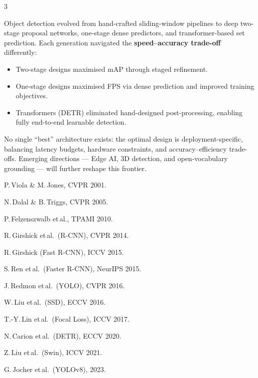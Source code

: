 \documentclass[10pt]{article} %
\renewcommand{\small}       {\fontsize{18pt}{23pt}\selectfont}
\renewcommand{\LARGE}       {\fontsize{38pt}{46pt}\selectfont}
\newcommand{\sechead}[1]{%
  \par\vspace*{0.45cm}%
  \noindent%
  \colorbox{posterblue}{%
    \makebox[\dimexpr\linewidth-2\fboxsep\relax][l]{%
      \hspace{0.5cm}{\color{white}\bfseries\LARGE\strut #1}%
    }%
  }%
  \par\vspace{0.3cm}%
  \noindent%
}
\begin{document}
\begin{multicols}{3}
\sechead{CONCLUSION}

Object detection evolved from hand-crafted sliding-window pipelines to
deep two-stage proposal networks, one-stage dense predictors, and
transformer-based set prediction.  Each generation navigated the
\textbf{speed--accuracy trade-off} differently:
\begin{itemize}[nosep, leftmargin=*]
  \item Two-stage designs maximised mAP through staged refinement.
  \item One-stage designs maximised FPS via dense prediction and
    improved training objectives.
  \item Transformers (DETR) eliminated hand-designed post-processing,
    enabling fully end-to-end learnable detection.
\end{itemize}

\medskip
No single ``best'' architecture exists: the optimal design is
deployment-specific, balancing latency budgets, hardware constraints,
and accuracy--efficiency trade-offs.  Emerging directions --- Edge AI,
3D detection, and open-vocabulary grounding --- will further reshape
this frontier.

\sechead{REFERENCES}

\begin{enumerate}[nosep, leftmargin=*, label={[\arabic*]}]
\small
\item P.\,Viola \& M.\,Jones, CVPR 2001.
\item N.\,Dalal \& B.\,Triggs, CVPR 2005.
\item P.\,Felzenszwalb et\,al., TPAMI 2010.
\item R.\,Girshick et\,al.\ (R-CNN), CVPR 2014.
\item R.\,Girshick (Fast R-CNN), ICCV 2015.
\item S.\,Ren et\,al.\ (Faster R-CNN), NeurIPS 2015.
\item J.\,Redmon et\,al.\ (YOLO), CVPR 2016.
\item W.\,Liu et\,al.\ (SSD), ECCV 2016.
\item T.-Y.\,Lin et\,al.\ (Focal Loss), ICCV 2017.
\item N.\,Carion et\,al.\ (DETR), ECCV 2020.
\item Z.\,Liu et\,al.\ (Swin), ICCV 2021.
\item G.\,Jocher et\,al.\ (YOLOv8), 2023.
\end{enumerate}

\end{multicols}
\end{document}
